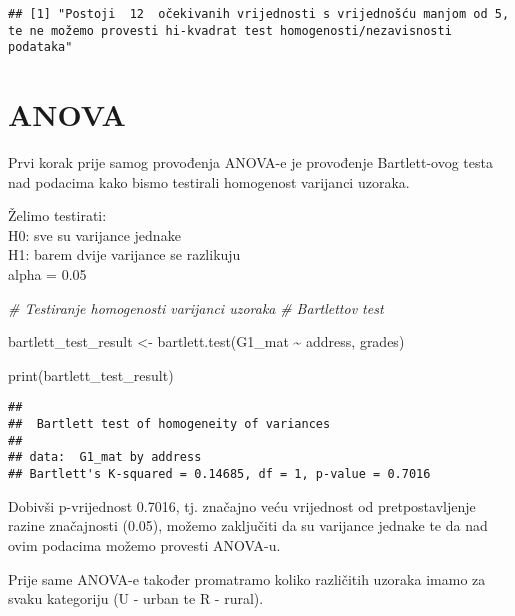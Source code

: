 \documentclass[
]{article}
\newenvironment{Shaded}{\begin{snugshade}}{\end{snugshade}}
\newcommand{\AttributeTok}[1]{\textcolor[rgb]{0.77,0.63,0.00}{#1}}
\newcommand{\CommentTok}[1]{\textcolor[rgb]{0.56,0.35,0.01}{\textit{#1}}}
\newcommand{\FunctionTok}[1]{\textcolor[rgb]{0.00,0.00,0.00}{#1}}
\newcommand{\NormalTok}[1]{#1}
\newcommand{\OtherTok}[1]{\textcolor[rgb]{0.56,0.35,0.01}{#1}}
\newcommand{\SpecialCharTok}[1]{\textcolor[rgb]{0.00,0.00,0.00}{#1}}
\newcommand{\StringTok}[1]{\textcolor[rgb]{0.31,0.60,0.02}{#1}}
\begin{document}
\begin{verbatim}
## [1] "Postoji  12  očekivanih vrijednosti s vrijednošću manjom od 5, te ne možemo provesti hi-kvadrat test homogenosti/nezavisnosti podataka"
\end{verbatim}

\hypertarget{anova}{%
\section{ANOVA}\label{anova}}

Prvi korak prije samog provođenja ANOVA-e je provođenje Bartlett-ovog
testa nad podacima kako bismo testirali homogenost varijanci uzoraka.

Želimo testirati:\\
H0: sve su varijance jednake\\
H1: barem dvije varijance se razlikuju\\
alpha = 0.05

\begin{Shaded}
\begin{Highlighting}[]
\CommentTok{\# Testiranje homogenosti varijanci uzoraka}
\CommentTok{\# Bartlettov test}

\NormalTok{bartlett\_test\_result }\OtherTok{\textless{}{-}} \FunctionTok{bartlett.test}\NormalTok{(G1\_mat }\SpecialCharTok{\textasciitilde{}}\NormalTok{ address, grades)}

\FunctionTok{print}\NormalTok{(bartlett\_test\_result)}
\end{Highlighting}
\end{Shaded}

\begin{verbatim}
## 
##  Bartlett test of homogeneity of variances
## 
## data:  G1_mat by address
## Bartlett's K-squared = 0.14685, df = 1, p-value = 0.7016
\end{verbatim}

Dobivši p-vrijednost 0.7016, tj. značajno veću vrijednost od
pretpostavljenje razine značajnosti (0.05), možemo zaključiti da su
varijance jednake te da nad ovim podacima možemo provesti ANOVA-u.

Prije same ANOVA-e također promatramo koliko različitih uzoraka imamo za
svaku kategoriju (U - urban te R - rural).

\begin{Shaded}
\end{Shaded}
\end{document}
